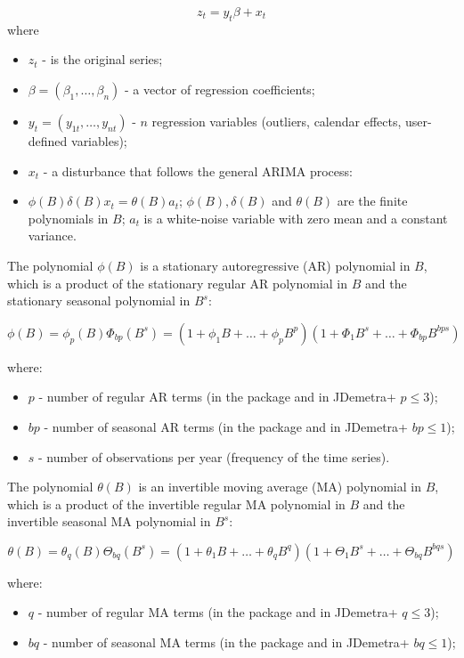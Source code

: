\documentclass[article]{jss}
\providecommand{\tightlist}{%
  \setlength{\itemsep}{0pt}\setlength{\parskip}{0pt}}
\begin{document}
\[z_t=y_t\beta+x_t\] where

\begin{itemize}
\tightlist
\item
  \(z_t\) - is the original series;
\item
  \(\beta = (\beta_1,\dots,\beta_n)\) - a vector of regression
  coefficients;
\item
  \(y_t = (y_{1t},\dots,y_{nt})\) - \(n\) regression variables
  (outliers, calendar effects, user-defined variables);
\item
  \(x_t\) - a disturbance that follows the general ARIMA process:
\item
  \(\phi(B)\delta(B)x_t=\theta(B)a_t\); \(\phi(B), \delta(B)\) and
  \(\theta(B)\) are the finite polynomials in \(B\); \(a_t\) is a
  white-noise variable with zero mean and a constant variance.
\end{itemize}

The polynomial \(\phi(B)\) is a stationary autoregressive (AR)
polynomial in \(B\), which is a product of the stationary regular AR
polynomial in \(B\) and the stationary seasonal polynomial in \(B^s\):

\[\phi(B)=\phi_p(B)\Phi_{bp}(B^s)=(1+\phi_1B+\dots+\phi_pB^p)(1+\Phi_1B^s+\dots+\Phi_{bp}B^{bps})\]

where:

\begin{itemize}
\tightlist
\item
  \(p\) - number of regular AR terms (in the package and in JDemetra+
  \(p \le 3\));
\item
  \(bp\) - number of seasonal AR terms (in the package and in JDemetra+
  \(bp \le 1\));
\item
  \(s\) - number of observations per year (frequency of the time
  series).
\end{itemize}

The polynomial \(\theta(B)\) is an invertible moving average (MA)
polynomial in \(B\), which is a product of the invertible regular MA
polynomial in \(B\) and the invertible seasonal MA polynomial in
\(B^s\):

\[\theta(B)=\theta_q(B)\Theta_{bq}(B^s)=(1+\theta_1B+\dots+\theta_qB^q)(1+\Theta_1B^s+\dots+\Theta_{bq}B^{bqs})\]

where:

\begin{itemize}
\tightlist
\item
  \(q\) - number of regular MA terms (in the package and in JDemetra+
  \(q \le 3\));
\item
  \(bq\) - number of seasonal MA terms (in the package and in JDemetra+
  \(bq \le 1\));
\end{itemize}
\end{document}

